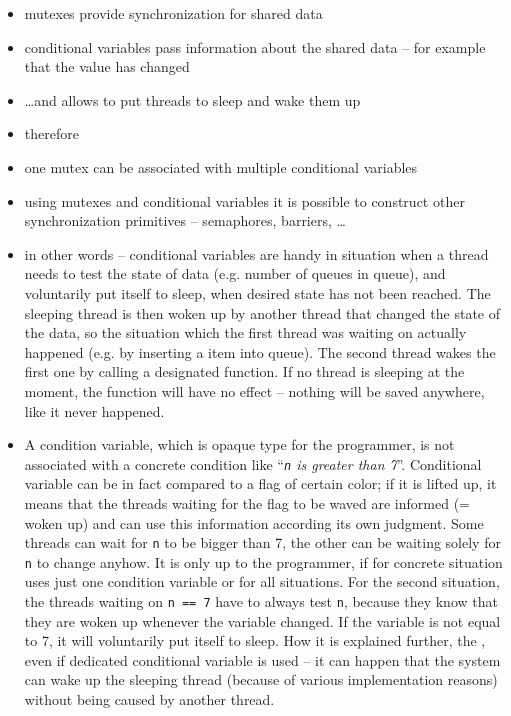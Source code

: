 
\begin{slide}
\begin{itemize}
\item mutexes provide synchronization for shared data
\item conditional variables pass information about the shared data --
for example that the value has changed
\item \dots{}and allows to put threads to sleep and wake them up
\item therefore 
\item one mutex can be associated with multiple conditional variables
\item using mutexes and conditional variables it is possible to construct
other synchronization primitives -- semaphores, barriers, \dots
\end{itemize}
\end{slide}

\label{CONDITION_VARIABLES}

\begin{itemize}
\item in other words -- conditional variables are handy in situation when a 
thread needs to test the state of  data (e.g. number of queues
in queue), and voluntarily put itself to sleep, when desired state has not
been reached. The sleeping thread is then woken up by another thread that
changed the state of the data, so the situation which the first thread was
waiting on actually happened (e.g. by inserting a item into queue).
The second thread wakes the first one by calling a designated function.
If no thread is sleeping at the moment, the function will have no effect --
nothing will be saved anywhere, like it never happened.
\item A condition variable, which is opaque type for the programmer, is not
associated with a concrete condition like ``\emph{\texttt{n} is greater than
7}''. Conditional variable can be in fact compared to a flag of certain color;
if it is lifted up, it means that the threads waiting for the flag to be waved
are informed (= woken up) and can use this information according its own
judgment. Some threads can wait for \texttt{n} to be bigger than 7, the other
can be waiting solely for \texttt{n} to change anyhow. It is only up to the
programmer, if for concrete situation uses just one condition variable or
for all situations. For the second situation, the threads waiting on 
\texttt{n == 7} have to always test \texttt{n}, because they know that they
are woken up whenever the variable changed. If the variable is not equal to 7,
it will voluntarily put itself to sleep. How it is explained further,
the , even if dedicated conditional
variable is used -- it can happen that the system can wake up the sleeping
thread (because of various implementation reasons) without being caused by
another thread.
\end{itemize}

